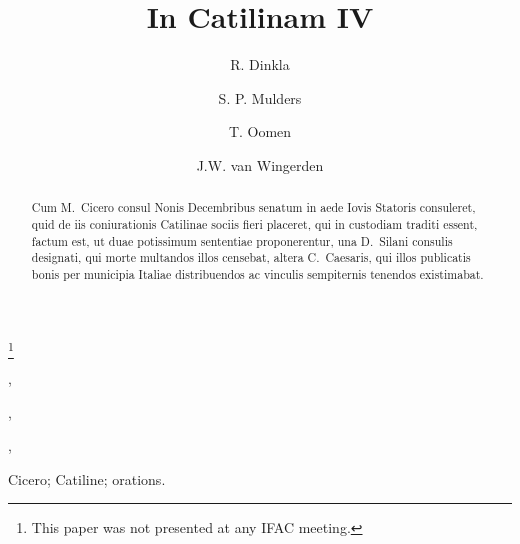 \documentclass[twocolumn]{autart}    %
\begin{document}
\begin{frontmatter}

\title{In Catilinam IV} %

\thanks[footnoteinfo]{This paper was not presented at any IFAC meeting.}

\author[TUD]{R. Dinkla},    %
\author[TUD]{S. P. Mulders},               %
\author[TUD,TUE]{T. Oomen},  %
\author[TUD]{J.W. van Wingerden}
\address[TUD]{Delft Center for Systems and Control, Delft University of Technology, Mekelweg 2, 2628CD Delft, The Netherlands}  %
\address[TUE]{Control Systems Technology Group, Eindhoven University of Technology, 5600
MB Eindhoven, The Netherlands}        %

          
\begin{keyword}                           %
Cicero; Catiline; orations.               %
\end{keyword}                             %


\begin{abstract}                          %
Cum M.~Cicero consul Nonis Decembribus senatum in aede Iovis 
Statoris consuleret, quid de iis coniurationis Catilinae sociis 
fieri placeret, qui in custodiam traditi essent, factum est, ut 
duae potissimum sententiae proponerentur, una D.~Silani consulis 
designati, qui morte multandos illos censebat, altera C.~Caesaris, 
qui illos publicatis bonis per municipia Italiae distribuendos 
ac vinculis sempiternis tenendos existimabat.
\end{abstract}

\end{frontmatter}
\end{document}
